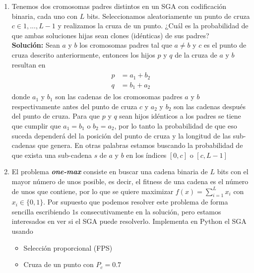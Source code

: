 \documentclass[10pt,letterpaper]{article}
\begin{document}
\begin{enumerate}
    \item Tenemos dos cromosomas padres distintos en un SGA con codificación binaria,
          cada uno con $L$ bits. Seleccionamos aleatoriamente un punto de cruza
          $c \in {1,...,L-1}$ y realizamos la cruza de un punto. ¿Cuál es la probabilidad
          de que ambas soluciones hijas sean clones (idénticas) de sus padres?\\[\baselineskip]
        \textbf{Solución:} Sean $a$ y $b$ los cromosomas padres tal que $a \neq b$ y $c$ es
        el punto de cruza descrito anteriormente, entonces los hijos $p$ y $q$ de la cruza
        de $a$ y $b$ resultan en
            \begin{equation*}\begin{split} \begin{aligned}
                p &= a_1 + b_2 \\
                q &= b_1 + a_2
            \end{aligned} \end{split} \end{equation*}
        donde $a_1$ y $b_1$ son las cadenas de los cromosomas padres $a$ y $b$
        respectivamente antes del punto de cruza $c$ y $a_2$ y $b_2$ son las cadenas después del
        punto de cruza. Para que $p$ y $q$ sean hijos idénticos a los padres se tiene que cumplir
        que $a_1 = b_1$ o $b_2 = a_2$, por lo tanto la probabilidad de que eso suceda dependerá
        del la posición del punto de cruza y la longitud de las sub-cadenas que genera. En otras
        palabras estamos buscando la probabilidad de que exista una sub-cadena $s$ de $a$ y $b$
        en los índices $[0, c]$ o $[c, L-1]$
    \item El problema \textit{\textbf{one-max}} consiste en buscar una cadena binaria de $L$
          bits con el mayor número de unos posible, es decir, el fitness de una cadena es el
          número de unos que contiene, por lo que se quiere maximizar $f(x) = \sum_{i=1}^{L} x_i$
          con $x_i \in \{0, 1\}$. Por supuesto que podemos resolver este problema de forma sencilla
          escribiendo $1$s consecutivamente en la solución, pero estamos interesados en ver si
          el SGA puede resolverlo. Implementa en Python el SGA usando
        \begin{itemize}
            \item Selección proporcional (FPS)
            \item Cruza de un punto con $P_c = 0.7$

\end{itemize}
\end{enumerate}
\end{document}
